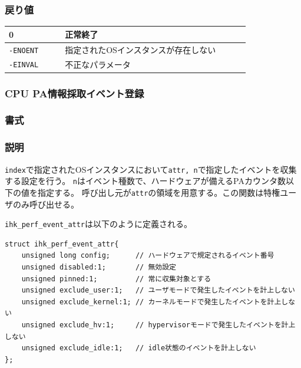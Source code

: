 \documentclass[twoside,11pt,fleqn]{book}
\begin{document}
\subsubsection*{戻り値}{\quad}
\begin{table}[!h]
\footnotesize
\begin{tabular}{|p{0.20\linewidth}|p{0.66\linewidth}|} \hline
0&正常終了\\ \hline
\texttt{-ENOENT}&指定されたOSインスタンスが存在しない\\ \hline
\texttt{-EINVAL}&不正なパラメータ\\ \hline
\end{tabular}
\vspace{-0em}
\end{table}
\FloatBarrier

\subsubsection{CPU PA情報採取イベント登録}
\subsubsection*{書式}{\quad} 
\subsubsection*{説明}{\quad} 
\texttt{index}で指定されたOSインスタンスにおいて\texttt{attr, n}で指定したイベントを収集する設定を行う。
\texttt{n}はイベント種数で、ハードウェアが備えるPAカウンタ数以下の値を指定する。
呼び出し元が\texttt{attr}の領域を用意する。この関数は特権ユーザのみ呼び出せる。

\texttt{ihk\_perf\_event\_attr}は以下のように定義される。
\footnotesize
\begin{Verbatim}[obeytabs]
struct ihk_perf_event_attr{
    unsigned long config;      // ハードウェアで規定されるイベント番号
    unsigned disabled:1;       // 無効設定
    unsigned pinned:1;         // 常に収集対象とする
    unsigned exclude_user:1;   // ユーザモードで発生したイベントを計上しない
    unsigned exclude_kernel:1; // カーネルモードで発生したイベントを計上しない
    unsigned exclude_hv:1;     // hypervisorモードで発生したイベントを計上しない
    unsigned exclude_idle:1;   // idle状態のイベントを計上しない
};
\end{Verbatim}
\normalsize
\end{document}
